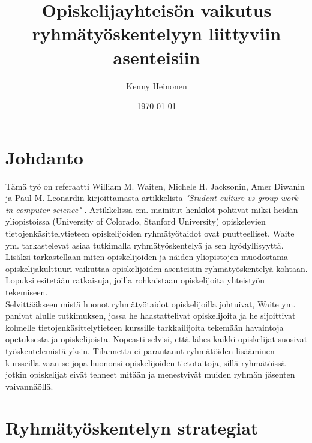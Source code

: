 \documentclass[finnish]{article}
\title{Opiskelijayhteisön vaikutus ryhmätyöskentelyyn liittyviin asenteisiin}
\author{Kenny Heinonen}
\date{\today}
\begin{document}

\maketitle        %
\newpage

\tableofcontents  %
\newpage          %



\section{Johdanto}



Tämä työ on referaatti William M. Waiten, Michele H. Jacksonin, Amer Diwanin ja Paul M. Leonardin kirjoittamasta artikkelista \emph{"Student culture vs group work in computer science"} \cite{Waite:2004:SCV:1028174.971308}.
Artikkelissa em. mainitut henkilöt pohtivat miksi heidän yliopistoissa (University of Colorado, Stanford University) opiskelevien tietojenkäsittelytieteen opiskelijoiden ryhmätyötaidot ovat puutteelliset. Waite ym. tarkastelevat asiaa tutkimalla ryhmätyöskentelyä ja sen hyödyllisyyttä. Lisäksi tarkastellaan miten opiskelijoiden ja näiden yliopistojen muodostama opiskelijakulttuuri vaikuttaa opiskelijoiden asenteisiin ryhmätyöskentelyä kohtaan. Lopuksi esitetään ratkaisuja, joilla rohkaistaan opiskelijoita yhteistyön tekemiseen.\\

Selvittääkseen mistä huonot ryhmätyötaidot opiskelijoilla johtuivat, Waite ym. panivat alulle tutkimuksen, jossa he haastattelivat opiskelijoita ja he sijoittivat kolmelle tietojenkäsittelytieteen kurssille tarkkailijoita tekemään havaintoja opetuksesta ja opiskelijoista. Nopeasti selvisi, että lähes kaikki opiskelijat suosivat työskentelemistä yksin. Tilannetta ei parantanut ryhmätöiden lisääminen kursseilla vaan se jopa huononsi opiskelijoiden tietotaitoja, sillä ryhmätöissä jotkin opiskelijat eivät tehneet mitään ja menestyivät muiden ryhmän jäsenten vaivannäöllä.

\section{Ryhmätyöskentelyn strategiat}
\end{document}
